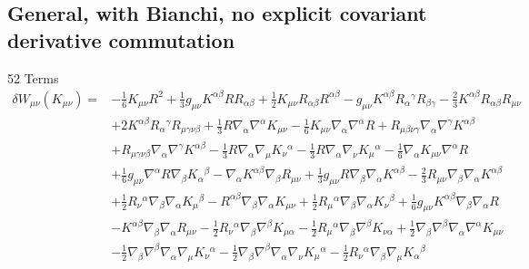 \documentclass[10pt,letterpaper]{article}
\begin{document}
\subsection*{General, with Bianchi, no explicit covariant derivative commutation}
52 Terms
\begin{align}
\delta W_{\mu\nu}(K_{\mu\nu})={}&- \tfrac{1}{6} K_{\mu \nu} R^2
 + \tfrac{1}{3} g_{\mu \nu} K^{\alpha \beta} R R_{\alpha \beta}
 + \tfrac{1}{2} K_{\mu \nu} R_{\alpha \beta} R^{\alpha \beta}
 -  g_{\mu \nu} K^{\alpha \beta} R_{\alpha}{}^{\gamma} R_{\beta \gamma}
 -  \tfrac{2}{3} K^{\alpha \beta} R_{\alpha \beta} R_{\mu \nu}\nonumber\\
& + 2 K^{\alpha \beta} R_{\alpha}{}^{\gamma} R_{\mu \gamma \nu \beta}
 + \tfrac{1}{3} R \nabla_{\alpha}\nabla^{\alpha}K_{\mu \nu}
 -  \tfrac{1}{6} K_{\mu \nu} \nabla_{\alpha}\nabla^{\alpha}R
 + R_{\mu \beta \nu \gamma} \nabla_{\alpha}\nabla^{\gamma}K^{\alpha \beta}\nonumber\\
& + R_{\mu \gamma \nu \beta} \nabla_{\alpha}\nabla^{\gamma}K^{\alpha \beta}
 -  \tfrac{1}{3} R \nabla_{\alpha}\nabla_{\mu}K_{\nu}{}^{\alpha}
 -  \tfrac{1}{3} R \nabla_{\alpha}\nabla_{\nu}K_{\mu}{}^{\alpha}
 -  \tfrac{1}{6} \nabla_{\alpha}K_{\mu \nu} \nabla^{\alpha}R\nonumber\\
& + \tfrac{1}{6} g_{\mu \nu} \nabla^{\alpha}R \nabla_{\beta}K_{\alpha}{}^{\beta}
 -  \nabla_{\alpha}K^{\alpha \beta} \nabla_{\beta}R_{\mu \nu}
 + \tfrac{1}{3} g_{\mu \nu} R \nabla_{\beta}\nabla_{\alpha}K^{\alpha \beta}
 -  \tfrac{2}{3} R_{\mu \nu} \nabla_{\beta}\nabla_{\alpha}K^{\alpha \beta}\nonumber\\
& + \tfrac{1}{2} R_{\nu}{}^{\alpha} \nabla_{\beta}\nabla_{\alpha}K_{\mu}{}^{\beta}
 -  R^{\alpha \beta} \nabla_{\beta}\nabla_{\alpha}K_{\mu \nu}
 + \tfrac{1}{2} R_{\mu}{}^{\alpha} \nabla_{\beta}\nabla_{\alpha}K_{\nu}{}^{\beta}
 + \tfrac{1}{6} g_{\mu \nu} K^{\alpha \beta} \nabla_{\beta}\nabla_{\alpha}R\nonumber\\
& -  K^{\alpha \beta} \nabla_{\beta}\nabla_{\alpha}R_{\mu \nu}
 -  \tfrac{1}{2} R_{\nu}{}^{\alpha} \nabla_{\beta}\nabla^{\beta}K_{\mu \alpha}
 -  \tfrac{1}{2} R_{\mu}{}^{\alpha} \nabla_{\beta}\nabla^{\beta}K_{\nu \alpha}
 + \tfrac{1}{2} \nabla_{\beta}\nabla^{\beta}\nabla_{\alpha}\nabla^{\alpha}K_{\mu \nu}\nonumber\\
& -  \tfrac{1}{2} \nabla_{\beta}\nabla^{\beta}\nabla_{\alpha}\nabla_{\mu}K_{\nu}{}^{\alpha}
 -  \tfrac{1}{2} \nabla_{\beta}\nabla^{\beta}\nabla_{\alpha}\nabla_{\nu}K_{\mu}{}^{\alpha}
 -  \tfrac{1}{2} R_{\nu}{}^{\alpha} \nabla_{\beta}\nabla_{\mu}K_{\alpha}{}^{\beta}

\end{align}
\end{document}
